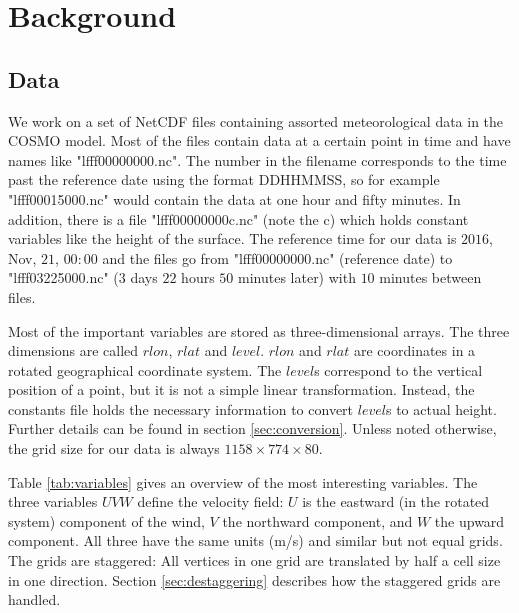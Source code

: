 \setcounter{chapter}{1}

\chapter{Background}
\section{Data}\label{sec:data}
We work on a set of NetCDF files containing assorted meteorological data in the COSMO model. Most of the files contain data at a certain point in time and have names like "lfff00000000.nc". The number in the filename corresponds to the time past the reference date using the format DDHHMMSS, so for example "lfff00015000.nc" would contain the data at one hour and fifty minutes. In addition, there is a file "lfff00000000c.nc" (note the c) which holds constant variables like the height of the surface. The reference time for our data is $2016$, Nov, $21$, $00:00$ and the files go from "lfff00000000.nc" (reference date) to "lfff03225000.nc" ($3$ days $22$ hours $50$ minutes later) with $10$ minutes between files.

Most of the important variables are stored as three-dimensional arrays. The three dimensions are called $rlon$, $rlat$ and $level$. $rlon$ and $rlat$ are coordinates in a rotated geographical coordinate system. The $level$s correspond to the vertical position of a point, but it is not a simple linear transformation. Instead, the constants file holds the necessary information to convert $level$s to actual height. Further details can be found in section \ref{sec:conversion}. Unless noted otherwise, the grid size for our data is always $1158 \times 774 \times 80$.

Table \ref{tab:variables} gives an overview of the most interesting variables. The three variables $UVW$ define the velocity field: $U$ is the eastward (in the rotated system) component of the wind, $V$ the northward component, and $W$ the upward component. All three have the same units (m/s) and similar but not equal grids. The grids are staggered: All vertices in one grid are translated by half a cell size in one direction. Section \ref{sec:destaggering} describes how the staggered grids are handled.

